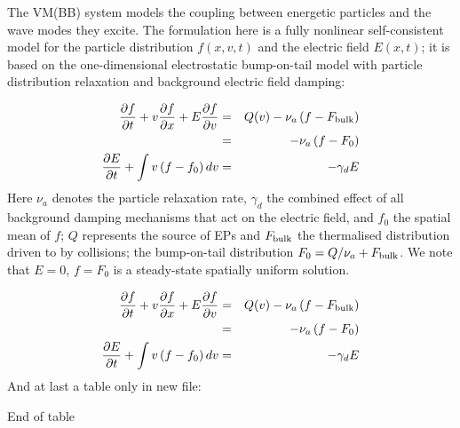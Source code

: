 The VM(BB) system models the coupling between energetic particles and the wave modes they excite.
The formulation here is a fully nonlinear self-consistent model for the particle distribution $f(x,v,t)$ and the electric field $E(x,t)$; it is based on the one-dimensional electrostatic bump-on-tail model with particle distribution relaxation and background electric field damping:

\begin{eqnarray}
\label{MVE2}
	\frac{\partial f}{\partial t} + v \frac{\partial f}{\partial x} + E \frac{\partial f}{\partial v} & = &
		Q(v) - \nu_a \left( f - F_{\rm bulk} \right) \\
		& = & - \nu_a \left( f - F_0 \right)         \\
\label{MDCE2}
	\frac{\partial E}{\partial t} + \int v \left( f - f_0 \right) dv & = & - \gamma_d E
\end{eqnarray}
%
Here $\nu_a$ denotes the particle relaxation rate, $\gamma_d$ the combined effect of all background damping mechanisms that act on the electric field, and $f_0$ the spatial mean of $f$; $Q$ represents the source of EPs and $F_{\rm bulk}$ the thermalised distribution driven to by collisions; the bump-on-tail distribution $F_0 = Q / \nu_a + F_{\rm bulk}$.
We note that $E = 0$, $f = F_0$ is a steady-state spatially uniform solution.

\begin{eqnarray}
\label{MVE2}
	\frac{\partial f}{\partial t} + v \frac{\partial f}{\partial x} + E \frac{\partial f}{\partial v} & = &
		Q(v) - \nu_a \left( f - F_{\rm bulk} \right) \\
		& = & - \nu_a \left( f - F_0 \right)         \\
\label{MDCE2}
	\frac{\partial E}{\partial t} + \int v \left( f - f_0 \right) dv & = & - \gamma_d E
\end{eqnarray}
%
And at last a table only in new file:



End of table

